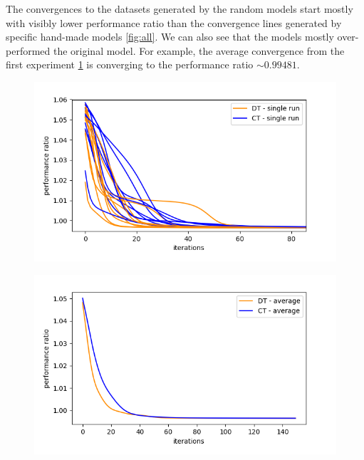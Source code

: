 \documentclass[thesis=M,english]{FITthesis}[2012/10/20]
\begin{document}
The convergences to the datasets generated by the random models start
mostly with visibly lower performance ratio than the convergence lines generated by specific hand-made models \ref{fig:all}.
We can also see that the models mostly over-performed the original model.
For example, the average convergence from the first experiment \ref{fig:avgc} is converging to the performance ratio $\sim 0.99481$.  

\begin{figure}
\centering
\begin{minipage}{.8\textwidth}
  \centering
  \includegraphics[width=1\linewidth]{img/ex1/g1.png}
  \label{fig:sr50}
\end{minipage}
\begin{minipage}{.8\textwidth}
  \centering
  \includegraphics[width=.95\linewidth]{img/ex1/g2.png}
  \label{fig:avgc}
\end{minipage}
\end{figure} 
\end{document}
